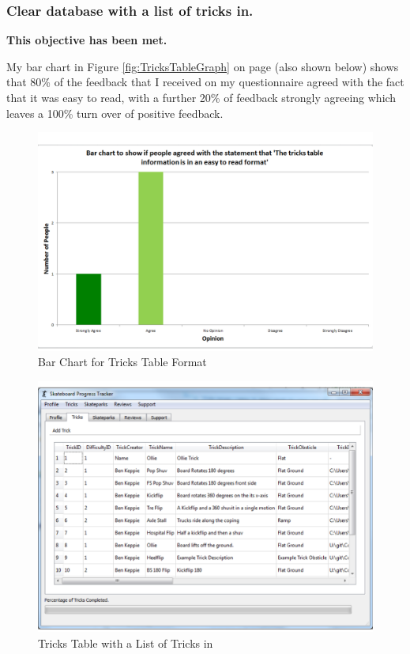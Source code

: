 \subsubsection{Clear database with a list of tricks in.} 

\textbf{This objective has been met.}

My bar chart in Figure \ref{fig:TricksTableGraph} on page \pageref{fig:TricksTableGraph} (also shown below) shows that 80\% of the feedback that I received on my questionnaire agreed with the fact that it was easy to read, with a further 20\% of feedback strongly agreeing which leaves a 100\% turn over of positive feedback.

\begin{figure}[H]
    \includegraphics[width=\textwidth]{./Evaluation/images/TricksTableGraph.pdf}
    \caption{Bar Chart for Tricks Table Format} \label{fig:TricksTableGraphCopy}
\end{figure}


\begin{figure}[H]
    \includegraphics[width=\textwidth]{./Evaluation/images/TricksTableNFS.pdf}
    \caption{Tricks Table with a List of Tricks in} \label{fig:TricksTableEX}
\end{figure}

